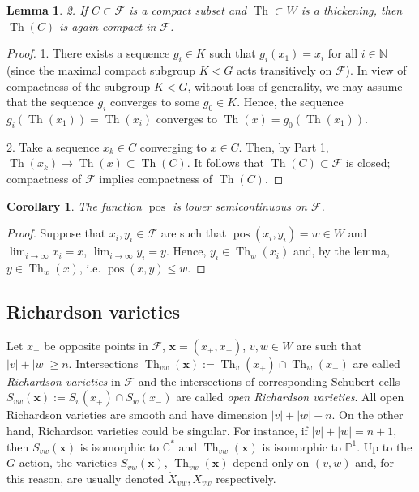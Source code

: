 \documentclass[12pt]{amsbook}%
\newtheorem{lem}[thm]{Lemma}
\newtheorem{cor}[thm]{Corollary}
\theoremstyle{definition}
\theoremstyle{remark}
\numberwithin{section}{chapter}
\numberwithin{subsection}{section}
\numberwithin{figure}{chapter}
\DeclareMathOperator{\Th}{Th}
\DeclareMathOperator{\pos}{pos}
\def\bC{{\mathbb{C}}}
\def\P{{\mathbb{P}}}
\def\bN{{\mathbb{N}}}
\def\cF{{\mathscr{F}}}
\def\bx{\mathbf{x}}
\begin{document}
{{\begin{lem}
2. If $C\subset \cF$ is a compact subset and $\Th\subset W$ is a thickening, then $\Th(C)$ is again compact in $\cF$. 
\end{lem}
\begin{proof} 1. There exists a sequence $g_i\in K$ such that $g_i(x_1)=x_i$ for all $i\in \bN$ (since the maximal compact subgroup $K< G$ 
acts transitively on $\cF$). In view of compactness of the subgroup $K< G$, without loss of generality, we may assume that the sequence $g_i$ converges to some $g_0\in K$. Hence, the sequence $g_i(\Th(x_1))=\Th(x_i)$ converges to $\Th(x)=g_0(\Th(x_1))$. 

2.  Take a sequence $x_k\in C$ converging to $x\in C$. Then, by Part 1, $\Th(x_k)\to \Th(x)\subset \Th(C)$. 
It follows that $\Th(C)\subset \cF$ is closed; compactness of $\cF$ implies compactness of 
$\Th(C)$. 
\end{proof}


\begin{cor}
The function $\pos$ is lower semicontinuous on $\cF$. 
\end{cor}
\begin{proof} Suppose that $x_i, y_i\in \cF$ are such that $\pos(x_i, y_i)=w\in W$ and $\lim_{i\to\infty} x_i=x$,  $\lim_{i\to\infty} y_i=y$. Hence, $y_i\in \Th_w(x_i)$ and, by the lemma, $y\in \Th_w(x)$, i.e. $\pos(x,y)\le w$. 
\end{proof}

\subsection{Richardson varieties}\label{sec:Richardson} 

Let $x_\pm$ be opposite points in $\cF$, $\bx=(x_+,x_-)$, $v, w\in W$ are such that $|v|+|w|\geqslant n$. Intersections 
$\Th_{vw}(\bx):=\Th_v(x_+)\cap \Th_w(x_-)$ are called 
{\em Richardson varieties} in $\cF$ and the intersections of corresponding Schubert cells $S_{vw}(\bx):= S_v(x_+)\cap S_w(x_-)$ are called {\em open 
 Richardson varieties}. All open Richardson varieties are smooth and have dimension $|v|+|w|-n$. On the other hand, Richardson varieties could be singular. 
 For instance, if $|v|+|w|=n+1$, then $S_{vw}(\bx)$ is isomorphic to $\bC^*$ and $\Th_{vw}(\bx)$ is isomorphic  to $\P^1$. Up to the $G$-action, 
 the varieties $S_{vw}(\bx)$, $\Th_{vw}(\bx)$ depend only on $(v,w)$ and, for this reason, are usually denoted $\mathring{X}_{vw}, X_{vw}$ respectively. 



}}
\end{document}
